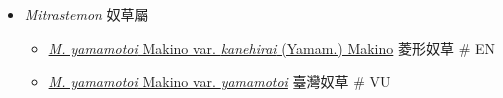 
  \begin{itemize}
 \item[] \textit{Mitrastemon} 奴草屬
                                
  \begin{itemize}
        \item[] \href{http://www.theplantlist.org/tpl1.1/search?q=Mitrastemon+yamamotoi+var.+kanehirai}{\textit{M. yamamotoi} Makino var. \textit{kanehirai} (Yamam.) Makino}   菱形奴草  \# EN
        \item[] \href{http://www.theplantlist.org/tpl1.1/search?q=Mitrastemon+yamamotoi+var.+yamamotoi}{\textit{M. yamamotoi} Makino var. \textit{yamamotoi}}   臺灣奴草  \# VU
  \end{itemize}
  \end{itemize}
